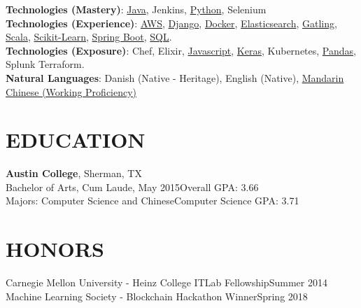 \documentclass[margin]{res}
\begin{document}
\begin{resume}
\textbf{Technologies (Mastery)}:
\href{https://www.lucaskjaerozhang.com/technology/java/}{Java},
Jenkins,
\href{https://www.lucaskjaerozhang.com/technology/python/}{Python},
Selenium
\\
\textbf{Technologies (Experience)}:
\href{https://www.lucaskjaerozhang.com/technology/aws}{AWS},
\href{https://www.lucaskjaerozhang.com/technology/django}{Django},
\href{https://www.lucaskjaerozhang.com/technology/docker}{Docker},
\href{https://www.lucaskjaerozhang.com/technology/elasticsearch}{Elasticsearch},
\href{https://www.lucaskjaerozhang.com/technology/gatling/}{Gatling},
\href{https://www.lucaskjaerozhang.com/technology/scala/}{Scala},
\href{https://www.lucaskjaerozhang.com/technology/sklearn/}{Scikit-Learn},
\href{https://www.lucaskjaerozhang.com/technology/spring-boot}{Spring Boot},
\href{https://www.lucaskjaerozhang.com/technology/sql}{SQL}.
\\
\textbf{Technologies (Exposure)}:
Chef,
Elixir,
\href{https://www.lucaskjaerozhang.com/technology/javascript}{Javascript},
\href{https://www.lucaskjaerozhang.com/technology/keras/}{Keras},
Kubernetes,
\href{https://www.lucaskjaerozhang.com/technology/pandas/}{Pandas},
Splunk
Terraform.
\\
\textbf{Natural Languages}: Danish (Native - Heritage), English (Native), \href{https://www.lucaskjaerozhang.com/lucas-kjaero-zhang-%E4%B8%AA%E4%BA%BA%E7%AE%80%E5%8E%86.pdf}{Mandarin Chinese (Working Proficiency)}


\section{EDUCATION}
\textbf{Austin College}, Sherman, TX\\
Bachelor of Arts, Cum Laude, May 2015\hfill Overall GPA:
3.66\\
Majors: Computer Science and Chinese\hfill Computer Science GPA: 3.71\\

\section{HONORS}
Carnegie Mellon University - Heinz College ITLab Fellowship\hfill Summer 2014\\
Machine Learning Society - Blockchain Hackathon Winner\hfill Spring 2018

\end{resume}
\end{document}
